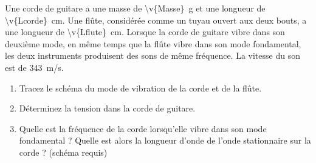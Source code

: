 
Une corde de guitare a une masse de \qty{\v{Masse}}{g} et une longueur de \qty{\v{Lcorde}}{cm}. Une flûte, considérée comme un tuyau ouvert aux deux bouts, a une longueur de \qty{\v{Lflute}}{cm}. Lorsque la corde de guitare vibre dans son deuxième mode, en même temps que la flûte vibre dans son mode fondamental, les deux instruments produisent des sons de même fréquence. La vitesse du son est de \qty{343}{m/s}.

\begin{enumerate}[label=\alph*)]
    \item Tracez le schéma du mode de vibration de la corde et de la flûte.
    \item Déterminez la tension dans la corde de guitare.
    \item Quelle est la fréquence de la corde lorsqu'elle vibre dans son mode fondamental ? Quelle est alors la longueur d'onde de l'onde stationnaire sur la corde ? (schéma requis)
\end{enumerate}